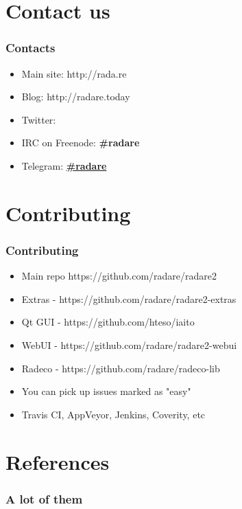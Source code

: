 \documentclass[10pt,pdf,utf8,english,compress,hyperref={unicode}]{beamer}
\begin{document}
\section{Contact us}

\begin{frame}[fragile]
  \frametitle{Contacts}
  \begin{itemize}
	  \item Main site: http://rada.re
	  \item Blog: http://radare.today
	  \item Twitter: \textbf{\href{https://twitter.com/radareorg}{\@radareorg}}
	  \item IRC on Freenode: \textbf{\#radare}
	  \item Telegram: \textbf{\href{https://telegram.me/joinchat/ACR-FkEK2owJSzMUYjt_NQ}{\#radare}}
  \end{itemize}
\end{frame}

\section{Contributing}

\begin{frame}[fragile]
  \frametitle{Contributing}
  \begin{itemize}
	  \item Main repo https://github.com/radare/radare2
	  \item Extras - https://github.com/radare/radare2-extras
	  \item Qt GUI - https://github.com/hteso/iaito
	  \item WebUI - https://github.com/radare/radare2-webui
	  \item Radeco - https://github.com/radare/radeco-lib
	  \item You can pick up issues marked as "easy"
	  \item Travis CI, AppVeyor, Jenkins, Coverity, etc
  \end{itemize}
\end{frame}

\ifxetex
\else
\section{References}
\begin{frame}[allowframebreaks]
	\frametitle{A lot of them}
	\printbibliography
\end{frame}
\fi
\end{document}

